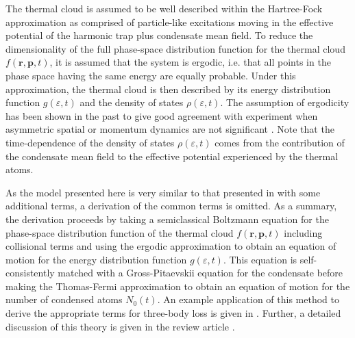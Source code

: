 The thermal cloud is assumed to be well described within the Hartree-Fock approximation \citep[Chapter 8]{PethickSmith} as comprised of particle-like excitations moving in the effective potential of the harmonic trap plus condensate mean field.  To reduce the dimensionality of the full phase-space distribution function for the thermal cloud $f(\bm{r}, \bm{p}, t)$, it is assumed that the system is ergodic, i.e.  that all points in the phase space having the same energy are equally probable.  Under this approximation, the thermal cloud is then described by its energy distribution function $g(\varepsilon, t)$ and the density of states $\rho(\varepsilon, t)$.  The assumption of ergodicity has been shown in the past to give good agreement with experiment when asymmetric spatial or momentum dynamics are not significant \citep{Bijlsma:2000,Davis:2000vn}.  Note that the time-dependence of the density of states $\rho(\varepsilon, t)$ comes from the contribution of the condensate mean field to the effective potential experienced by the thermal atoms.


As the model presented here is very similar to that presented in \citep{Bijlsma:2000} with some additional terms, a derivation of the common terms is omitted. As a summary, the derivation proceeds by taking a semiclassical Boltzmann equation for the phase-space distribution function of the thermal cloud $f(\bm{r}, \bm{p}, t)$ including collisional terms and using the ergodic approximation to obtain an equation of motion for the energy distribution function $g(\varepsilon, t)$. This equation is self-consistently matched with a Gross-Pitaevskii equation for the condensate before making the Thomas-Fermi approximation to obtain an equation of motion for the number of condensed atoms $N_0(t)$. An example application of this method to derive the appropriate terms for three-body loss is given in . Further, a detailed discussion of this theory is given in the review article \citep{Proukakis:2008}.

